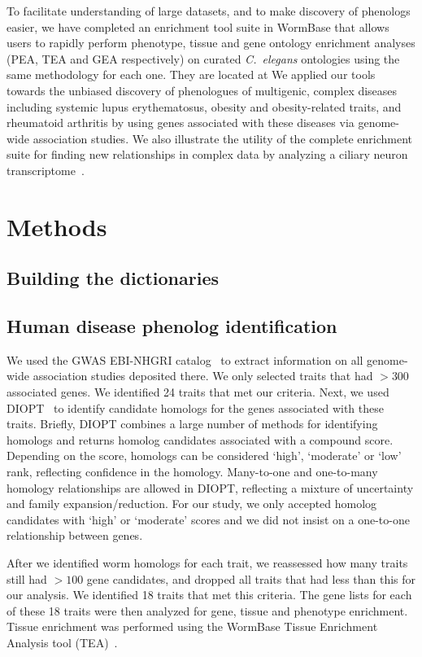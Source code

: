 \documentclass[10pt,letterpaper,twocolumn]{article}
\newcommand{\cel}{\emph{C.~elegans}}
\begin{document}
To facilitate understanding of large datasets, and to make discovery of
phenologs easier, we have completed an enrichment tool suite in WormBase
that allows users to rapidly perform phenotype, tissue and gene ontology
enrichment analyses (PEA, TEA and GEA respectively) on curated \cel{} ontologies
using the same methodology for each one. They are located at
We applied our tools towards the unbiased discovery of phenologues of
multigenic, complex diseases including
systemic lupus erythematosus, obesity and obesity-related traits,  and
rheumatoid arthritis
by using genes associated with these
diseases via genome-wide association studies. We also illustrate the utility of
the complete enrichment suite for finding new relationships in complex data by
analyzing a ciliary neuron transcriptome~\cite{}.

\section*{Methods}
\subsection*{Building the dictionaries}

\subsection*{Human disease phenolog identification}
We used the GWAS EBI-NHGRI catalog~\cite{} to extract information on all genome-wide
association studies deposited there. We only selected traits that had $>300$
associated genes. We identified 24 traits that met our criteria. Next, we used
DIOPT~\cite{} to identify candidate homologs for the genes associated with these
traits. Briefly, DIOPT combines a large number of methods for identifying homologs
and returns homolog candidates associated with a compound score. Depending on the score,
homologs can be considered `high', `moderate' or `low' rank, reflecting confidence
in the homology. Many-to-one and one-to-many homology relationships are allowed
in DIOPT, reflecting a mixture of uncertainty and family expansion/reduction.
For our study, we only accepted homolog candidates with `high' or `moderate' scores
and we did not insist on a one-to-one relationship between genes.

After we identified worm homologs for each trait, we reassessed how many traits
still had $>100$ gene candidates, and dropped all traits that had less than this
for our analysis. We identified 18 traits that met this criteria. The gene
lists for each of these 18 traits were then analyzed for gene, tissue and
phenotype enrichment. Tissue enrichment was performed using the WormBase Tissue
Enrichment Analysis tool (TEA)~\cite{}.
\end{document}
